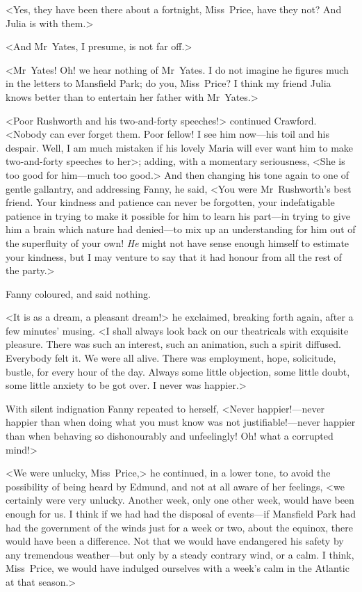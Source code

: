 <Yes, they have been there about a fortnight, Miss~Price, have they not? And Julia is with them.>

<And Mr~Yates, I presume, is not far off.>

<Mr~Yates! Oh! we hear nothing of Mr~Yates. I do not imagine he figures much in the letters to Mansfield Park; do you, Miss~Price? I think my friend Julia knows better than to entertain her father with Mr~Yates.>

<Poor Rushworth and his two-and-forty speeches!> continued Crawford. <Nobody can ever forget them. Poor fellow! I see him now—his toil and his despair. Well, I am much mistaken if his lovely Maria will ever want him to make two-and-forty speeches to her>; adding, with a momentary seriousness, <She is too good for him—much too good.> And then changing his tone again to one of gentle gallantry, and addressing Fanny, he said, <You were Mr~Rushworth's best friend. Your kindness and patience can never be forgotten, your indefatigable patience in trying to make it possible for him to learn his part—in trying to give him a brain which nature had denied—to mix up an understanding for him out of the superfluity of your own! \textit{He}  might not have sense enough himself to estimate your kindness, but I may venture to say that it had honour from all the rest of the party.>

Fanny coloured, and said nothing.

<It is as a dream, a pleasant dream!> he exclaimed, breaking forth again, after a few minutes' musing. <I shall always look back on our theatricals with exquisite pleasure. There was such an interest, such an animation, such a spirit diffused. Everybody felt it. We were all alive. There was employment, hope, solicitude, bustle, for every hour of the day. Always some little objection, some little doubt, some little anxiety to be got over. I never was happier.>

With silent indignation Fanny repeated to herself, <Never happier!—never happier than when doing what you must know was not justifiable!—never happier than when behaving so dishonourably and unfeelingly! Oh! what a corrupted mind!>

<We were unlucky, Miss~Price,> he continued, in a lower tone, to avoid the possibility of being heard by Edmund, and not at all aware of her feelings, <we certainly were very unlucky. Another week, only one other week, would have been enough for us. I think if we had had the disposal of events—if Mansfield Park had had the government of the winds just for a week or two, about the equinox, there would have been a difference. Not that we would have endangered his safety by any tremendous weather—but only by a steady contrary wind, or a calm. I think, Miss~Price, we would have indulged ourselves with a week's calm in the Atlantic at that season.>

